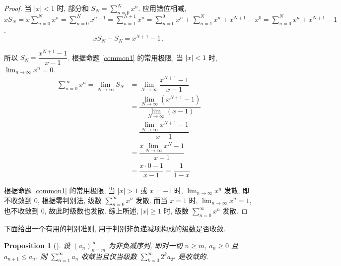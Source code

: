 \documentclass[UTF8]{ctexart}
\theoremstyle{mystyle}
\newtheorem{proposition}{Proposition}[section]
\theoremstyle{myremark}
\theoremstyle{plain}
\begin{document}
\begin{proof}
    当 $ |x| < 1 $ 时, 部分和 $ \displaystyle S_N = \sum_{n = 0}^{N} x^n $. 应用错位相减, $ \displaystyle x S_N = x \sum_{n = 0}^{N} x^n = \sum_{n = 0}^{N} x^{n + 1} = \sum_{n = 1}^{N + 1} x^n = \sum_{n = 0}^{0} x^n + \sum_{n = 1}^{N} x^n + x^{N + 1} - x^0 = \sum_{n = 0}^{N} x^n + x^{N + 1} - 1 $. 
    \[ xS_N - S_N = x^{N + 1} - 1 \,,\]

    所以 $ \displaystyle S_N = \dfrac{x^{N + 1} - 1}{x - 1} $. 根据命题 \ref{common1} 的常用极限, 当 $ |x| < 1 $ 时, $ \displaystyle \lim_{n \to \infty} x^n = 0 $.
    \begin{align*} 
        \sum_{n = 0}^{\infty} x^n = \lim\limits_{N \to \infty} S_N &= \lim\limits_{N \to \infty} \dfrac{x^{N + 1} - 1}{x - 1} \\
        &= \dfrac{\lim\limits_{N \to \infty}(x^{N + 1} - 1)}{\lim\limits_{N \to \infty} (x - 1)} \\
        &= \dfrac{\lim\limits_{N \to \infty} x^{N + 1} - 1}{x - 1} \\
        &= \dfrac{ x \lim\limits_{N \to \infty} x^N - 1}{x - 1} \\
        &= \dfrac{x \cdot 0 - 1}{x - 1} = \dfrac{1}{1 - x}
    \end{align*}

    根据命题 \ref{common1} 的常用极限, 当 $ |x| > 1 $ 或 $ x = -1 $ 时, $ \displaystyle \lim_{n \to \infty} x^n $ 发散, 即不收敛到 $ 0 $, 根据零判别法, 级数 $ \displaystyle \sum_{n = 0}^{\infty} x^n $ 发散. 而当 $ x = 1 $ 时, $ \displaystyle \lim_{n \to \infty} x^n = 1 $, 也不收敛到 $ 0 $, 故此时级数也发散. 综上所述, $ |x| \geqslant 1 $ 时, 级数 $ \displaystyle \sum_{n = 0}^{\infty} x^n $ 发散.
\end{proof}

下面给出一个有用的判别准则, 用于判别非负递减项构成的级数是否收敛.

\begin{proposition}[]
    设 $ (a_n)_{n = m}^{\infty} $ 为非负减序列, 即对一切 $ n \geqslant m $, $ a_n \geqslant 0 $ 且 $ a_{n + 1} \leqslant a_n $. 则 $ \displaystyle \sum_{n = 1}^{\infty} a_n $ 收敛当且仅当级数 $ \displaystyle \sum_{k = 0}^{\infty} 2^k a_{2^k} $ 是收敛的.
\end{proposition}
\end{document}
